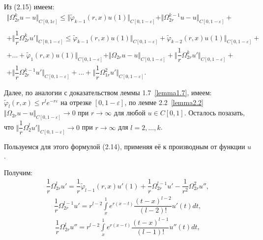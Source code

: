 Из (2.15) имеем:
\begin{equation}
\begin{array}{c}
\nonumber

\Vert \Omega_{2r}^ku - u \Vert_{C[0,1\varepsilon]} \leq \Vert \widetilde\varphi_{k-1}(r,x)u(1)\Vert_{C[0,1-\varepsilon]} + \Vert \Omega_{2r}^{k-1}u - u \Vert_{C[0,1-\varepsilon]} + \\\\ + \biggl\Vert \dfrac{1}{r}\Omega_{2r}^ku'\biggr\Vert_{C[0,1-\varepsilon]} \leq \widetilde\varphi_{k-1}(r,x)u(1)\Vert_{C[0,1-\varepsilon]} + \widetilde\varphi_{k-2}(r,x)u(1)\Vert_{C[0,1-\varepsilon]} + \\ + ... + \widetilde\varphi_1(r,x)u(1)\Vert_{C[0,1-\varepsilon]} + \Vert \Omega_{2r}u - u \Vert_{C[0,1-\varepsilon]} + \biggl\Vert \dfrac{1}{r}\Omega_{2r}^ku'\biggr\Vert_{C[0,1-\varepsilon]} + \\ + \biggl\Vert \dfrac{1}{r}\Omega_{2r}^{k-1}u'\biggr\Vert_{C[0,1-\varepsilon]} + ... + \biggl\Vert \dfrac{1}{r}\Omega_{1r}^2u'\biggr\Vert_{C[0,1-\varepsilon]}.

\end{array}
\end{equation}

Далее, по аналогии с доказательством леммы 1.7~\eqref{lemma1.7}, имеем: $ \widetilde\varphi_l(r,x) \leq r^le^{-r\varepsilon} $ на отрезке $ [0,1-\varepsilon] $, по лемме 2.2~\eqref{lemma2.2} $ \Vert \Omega_{2r}u - u \Vert_{C[0,1-\varepsilon]} \rightarrow 0 $ при $ r \rightarrow \infty $ для любой $ u \in C[0,1] $. Осталось позазать, что $ \biggl\Vert \dfrac{1}{r}\Omega_2^lu' \biggr\Vert_{C[0,1-\varepsilon]} \rightarrow 0 $ при $ r \rightarrow \infty $ для $ l = 2,...,k $.

Пользуемся для этого формулой (2.14), применяя её к производным от функции $ u $.

Получим:
\begin{equation}
\begin{array}{c}
\nonumber

\dfrac{1}{r}\Omega_{2r}^lu' = \dfrac{1}{r} \widetilde\varphi_{l-1}(r,x)u'(1) + \dfrac{1}{r}\Omega_{2r}^{l-1}u' - \dfrac{1}{r^2}\Omega_{2r}^2u'',

\end{array}
\end{equation}
\begin{equation}
\begin{array}{c}

\dfrac{1}{r}\Omega_{2r}^{l-1}u' = r^{l-2}\int\limits_x^1 e^{r(x-t)}\dfrac{(t-x)^{l-2}}{(l-2)!}u'(t)dt,

\end{array}
\end{equation}
\begin{equation}
\begin{array}{c}

\dfrac{1}{r}\Omega_{2r}^lu'' = r^{l-2}\int\limits_x^1 e^{r(x-t)}\dfrac{(t-x)^{l-1}}{(l-1)!}u''(t)dt,

\end{array}
\end{equation}

